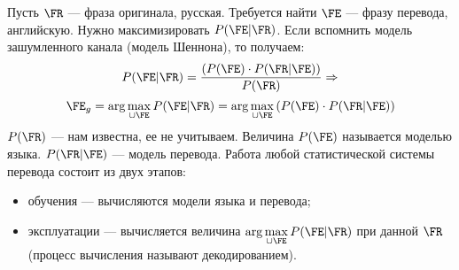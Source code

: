 
Пусть $\FR$ --- фраза оригинала, русская. 
Требуется найти $\FE$ --- фразу перевода, английскую.
Нужно максимизировать $P(\FE|\FR)$. 
Если вспомнить модель зашумленного канала (модель Шеннона), то получаем:
\[
	P(\FE|\FR) =  \dfrac{\left( P(\FE) \cdot P(\FR|\FE) \right) }{P(\FR)}  \Rightarrow
\]
\[
	\FE_g = \arg\max\limits_{\cup \FE} P(\FE|\FR) =  \arg\max\limits_{\cup \FE} \left(  P(\FE) \cdot P(\FR|\FE) \right) 
\]
$P(\FR)$ --- нам известна, ее не учитываем.
Величина $ P(\FE) $ называется моделью языка. $ P(\FR|\FE) $ --- модель перевода.
Работа любой статистической системы перевода состоит из двух этапов:
\begin{itemize}
	\item обучения --- вычисляются модели языка и перевода;
	\item эксплуатации --- вычисляется величина $\arg\max\limits_{\cup \FE} P(\FE|\FR)$ при данной $\FR$
		(процесс вычисления называют декодированием).
\end{itemize}
 
